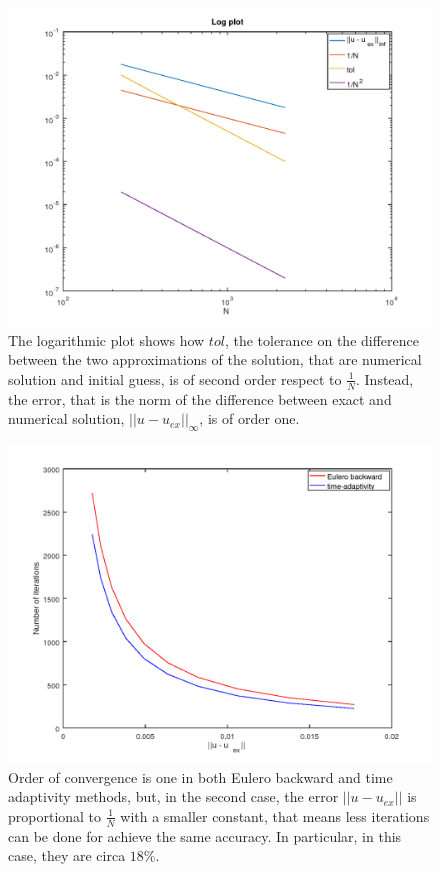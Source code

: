 \begin{figure}[h]
	\centering
	\includegraphics[width=1\linewidth]{time_order}
	\caption[Logarithmic plot of convergence orders is time adaptivity]{The logarithmic plot shows how $ tol $, the tolerance on the difference between the two approximations of the solution, that are numerical solution and initial guess, is of second order respect to $ \frac{1}{N} $. Instead, the error, that is the norm of the difference between exact and numerical solution, $|| u -u _{ex}||_{\infty}$, is of order one.}
	\label{time_order}
\end{figure}
\begin{figure}[h]
	\centering
	\includegraphics[width=1\linewidth]{ta_vs_ei}
	\caption[Comparizon of time steps' number needed by Eulero backward and time adaptivity]{Order of convergence is one in both Eulero backward and time adaptivity methods, but, in the second case, the error $ ||u - u_{ex}|| $ is proportional to $ \frac{1}{N} $ with a smaller constant, that means less iterations can be done for achieve the same accuracy. In particular, in this case, they are circa $ 18\% $. }
	\label{num_spets}
\end{figure}
